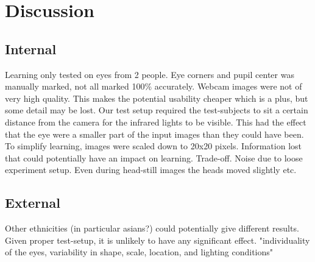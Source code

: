 \section{Discussion}
\subsection{Internal}

Learning only tested on eyes from 2 people.
Eye corners and pupil center was manually marked, not all marked 100\% accurately.
Webcam images were not of very high quality. This makes the potential usability cheaper which is a plus, but some detail may be lost.
Our test setup required the test-subjects to sit a certain distance from the camera for the infrared lights to be visible. This had the effect that the eye were a smaller part of the input images than they could have been.
To simplify learning, images were scaled down to 20x20 pixels. Information lost that could potentially have an impact on learning. Trade-off.
Noise due to loose experiment setup. Even during head-still images the heads moved slightly etc.

\subsection{External}
Other ethnicities (in particular asians?) could potentially give different results. Given proper test-setup, it is unlikely to have any significant effect.
"individuality of the eyes, variability in shape, scale, location, and lighting conditions"